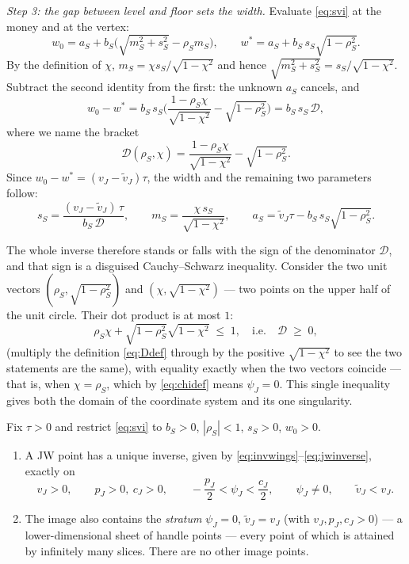 \emph{Step 3: the gap between level and floor sets the width.}
Evaluate \eqref{eq:svi} at the money and at the vertex:
\begin{equation}
w_0=a_S+b_S\Big(\sqrt{m_S^2+s_S^2}-\rho_Sm_S\Big),
\qquad
w^*=a_S+b_S\,s_S\sqrt{1-\rho_S^2}.
\label{eq:twoids}
\end{equation}
By the definition of $\chi$, $m_S=\chi s_S/\sqrt{1-\chi^2}$ and hence
$\sqrt{m_S^2+s_S^2}=s_S/\sqrt{1-\chi^2}$.  Subtract the second identity
from the first: the unknown $a_S$ cancels, and
\[
w_0-w^*
=b_S\,s_S\Big(\frac{1-\rho_S\chi}{\sqrt{1-\chi^2}}
-\sqrt{1-\rho_S^2}\Big)
=b_S\,s_S\,\mathcal{D},
\]
where we name the bracket
\begin{equation}
\mathcal{D}(\rho_S,\chi)
=\frac{1-\rho_S\chi}{\sqrt{1-\chi^2}}-\sqrt{1-\rho_S^2}.
\label{eq:Ddef}
\end{equation}
Since $w_0-w^*=(v_J-\tilde v_J)\tau$, the width and the remaining two
parameters follow:
\begin{equation}
s_S=\frac{(v_J-\tilde v_J)\,\tau}{b_S\,\mathcal{D}},\qquad
m_S=\frac{\chi\,s_S}{\sqrt{1-\chi^2}},\qquad
a_S=\tilde v_J\tau-b_S\,s_S\sqrt{1-\rho_S^2}.
\label{eq:jwinverse}
\end{equation}

The whole inverse therefore stands or falls with the sign of the
denominator $\mathcal{D}$, and that sign is a disguised
Cauchy--Schwarz inequality.  Consider the two unit vectors
$(\rho_S,\sqrt{1-\rho_S^2})$ and $(\chi,\sqrt{1-\chi^2})$ --- two
points on the upper half of the unit circle.  Their dot product is at
most $1$:
\begin{equation}
\rho_S\chi+\sqrt{1-\rho_S^2}\sqrt{1-\chi^2}\;\le\;1,
\quad\text{i.e.}\quad
\mathcal{D}\;\ge\;0,
\label{eq:Dpos}
\end{equation}
(multiply the definition \eqref{eq:Ddef} through by the positive
$\sqrt{1-\chi^2}$ to see the two statements are the same), with
equality exactly when the two vectors coincide --- that is, when
$\chi=\rho_S$, which by \eqref{eq:chidef} means $\psi_J=0$.  This
single inequality gives both the domain of the coordinate system and
its one singularity.

\begin{theorem}
\label{thm:jwimage}
Fix $\tau>0$ and restrict \eqref{eq:svi} to $b_S>0$, $|\rho_S|<1$,
$s_S>0$, $w_0>0$.
\begin{enumerate}[label=(\roman*)]
\item A JW point has a unique inverse, given by
\eqref{eq:invwings}--\eqref{eq:jwinverse}, exactly on
\begin{equation}
v_J>0,\qquad p_J>0,\ c_J>0,\qquad
-\frac{p_J}{2}<\psi_J<\frac{c_J}{2},\qquad
\psi_J\ne0,\qquad \tilde v_J<v_J .
\label{eq:regdom}
\end{equation}
\item The image also contains the \emph{stratum} $\psi_J=0$,
$\tilde v_J=v_J$ (with $v_J,p_J,c_J>0$) --- a lower-dimensional sheet
of handle points --- every point of which is attained by infinitely
many slices.  There are no other image points.
\end{enumerate}
\end{theorem}

